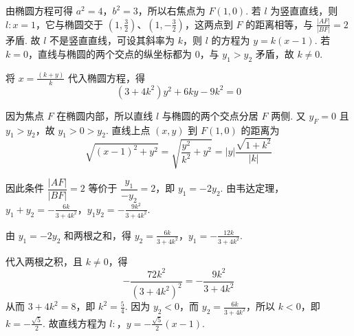 \begin{solution}
由椭圆方程可得 \(a^2=4\)，\(b^2=3\)，所以右焦点为 \(F(1,0)\). 若 \(l\) 为竖直直线，则 \(l:x=1\)，它与椭圆交于 \(\left(1,\frac{3}{2}\right)\)、\(\left(1,-\frac{3}{2}\right)\)，这两点到 \(F\) 的距离相等，与 \(\frac{|AF|}{|BF|}=2\) 矛盾. 故 \(l\) 不是竖直直线，可设其斜率为 \(k\)，则 \(l\) 的方程为 \(y=k(x-1)\). 若 \(k=0\)，直线与椭圆的两个交点的纵坐标都为 \(0\)，与 \(y_1>y_2\) 矛盾，故 \(k\ne0\).

将 \(x=\frac{(k+y)}{k}\) 代入椭圆方程，得
\[
(3+4k^2)y^2+6ky-9k^2=0
\]

因为焦点 \(F\) 在椭圆内部，所以直线 \(l\) 与椭圆的两个交点分居 \(F\) 两侧. 又 \(y_F=0\) 且 \(y_1>y_2\)，故 \(y_1>0>y_2\). 直线上点 \((x,y)\) 到 \(F(1,0)\) 的距离为
\[
\sqrt{(x-1)^2+y^2}=\sqrt{\frac{y^2}{k^2}+y^2}=|y|\frac{\sqrt{1+k^2}}{|k|}
\]

因此条件 \(\dfrac{|AF|}{|BF|}=2\) 等价于 \(\dfrac{y_1}{-y_2}=2\)，即 \(y_1=-2y_2\). 由韦达定理，
\(y_1+y_2=-\frac{6k}{3+4k^2}\)，\(y_1y_2=-\frac{9k^2}{3+4k^2}\).

由 \(y_1=-2y_2\) 和两根之和，得
\(y_2=\frac{6k}{3+4k^2}\)，\(y_1=-\frac{12k}{3+4k^2}\).

代入两根之积，且 \(k\ne0\)，得
\[
-\frac{72k^2}{(3+4k^2)^2}=-\frac{9k^2}{3+4k^2}
\]
从而 \(3+4k^2=8\)，即 \(k^2=\frac{5}{4}\). 因为 \(y_2<0\)，而 \(y_2=\frac{6k}{3+4k^2}\)，所以 \(k<0\)，即 \(k=-\frac{\sqrt{5}}{2}\). 故直线方程为
\(l:\)，\(y=-\frac{\sqrt{5}}{2}(x-1)\).

\end{solution}
